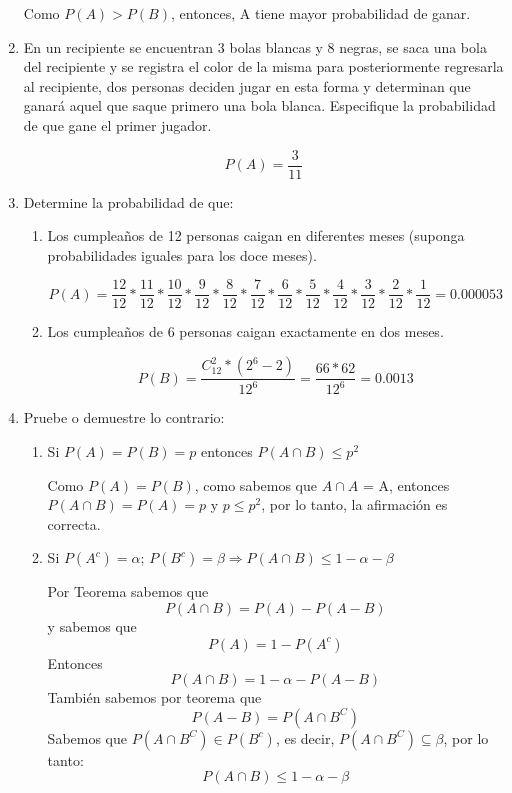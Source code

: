 \documentclass[letterpaper,11pt]{article}
\renewcommand{%
	\contentsname}{\vspace{-1cm} \hfill\bfseries\LARGE Índice \hfill \vspace{0.2cm}%
}
\begin{document}
\begin{enumerate}
Como $P(A)>P(B)$, entonces, A tiene mayor probabilidad de ganar.

\item En un recipiente se encuentran 3 bolas blancas y 8 negras, se saca una bola del recipiente y se registra el color de la misma para posteriormente regresarla al recipiente, dos personas deciden jugar en esta forma y determinan que ganará aquel que saque primero una bola blanca. Especifique la probabilidad de que gane el primer jugador.

$$
P(A) = \frac{3}{11}
$$

\item Determine la probabilidad de que: 
\begin{enumerate}
	\item Los cumpleaños de 12 personas caigan en diferentes meses (suponga probabilidades iguales para los doce meses).
	
	$$
	P(A)= \frac{12}{12} * \frac{11}{12} * \frac{10}{12} * \frac{9}{12} * \frac{8}{12} * \frac{7}{12} * \frac{6}{12} * \frac{5}{12} * \frac{4}{12} * \frac{3}{12} * \frac{2}{12} * \frac{1}{12}= 0.000053
	$$

	\item Los cumpleaños de 6 personas caigan exactamente en dos meses. 
	
	$$
	P (B) = \frac{C_12^2 * (2^6 - 2) }{12^6} = \frac{66 * 62}{12^6} = 0.0013
	$$


\end{enumerate}

\item Pruebe o demuestre lo contrario:  
\begin{enumerate}
	\item Si  $P(A)=P(B)=p$ entonces $P(A\cap B)\leq p^2$
	
	Como $P(A) = P(B)$, como sabemos que $A \cap A$ = A, entonces $P(A\cap B) = P(A)= p$ y $p \leq p^2$, por lo tanto, la afirmación es correcta. 

	\item Si $P(A^c) = \alpha $; $P(B^c)= \beta \Rightarrow  P(A\cap B)\leq 1 - \alpha - \beta $ 
	
	Por Teorema sabemos que
	$$P(A \cap B) = P(A)-P(A-B)$$
	y sabemos que 
	$$P(A)=1-P(A^c)$$ Entonces 
	$$P(A \cap B) = 1 - \alpha - P(A-B)$$	
	También sabemos por teorema que 
	$$P(A-B)= P(A \cap B^C)$$ %
	Sabemos que $P(A \cap B^C)  \in P(B^c)$, es decir, $P(A \cap B^C)  \subseteq  \beta$, por lo tanto:
	$$
	P(A\cap B)\leq 1 - \alpha - \beta
	$$


\end{enumerate}
\end{enumerate}
\end{document}
